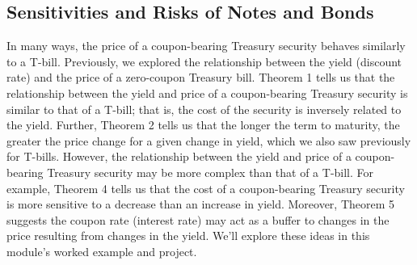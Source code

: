\documentclass[11pt]{article}
\theoremstyle{definition}
\begin{document}

\subsection{Sensitivities and Risks of Notes and Bonds}
In many ways, the price of a coupon-bearing Treasury security behaves similarly to a T-bill.
Previously, we explored the relationship between the yield (discount rate) and the price of a zero-coupon Treasury bill. 
Theorem 1 tells us that the relationship between the yield and price of a coupon-bearing Treasury security is similar to that of a T-bill; that is, the cost of the security is inversely related to the yield.
Further, Theorem 2 tells us that the longer the term to maturity, the greater the price change for a given change in yield, which we also saw previously for T-bills.
However, the relationship between the yield and price of a coupon-bearing Treasury security may be more complex than that of a T-bill. For example, Theorem 4 tells us that the cost of a coupon-bearing Treasury security is more sensitive to a decrease than an increase in yield. Moreover, Theorem 5 suggests the coupon rate (interest rate) may act as a buffer to changes in the price resulting from changes in the yield. We'll explore these ideas in this module's worked example and project.
\end{document}
